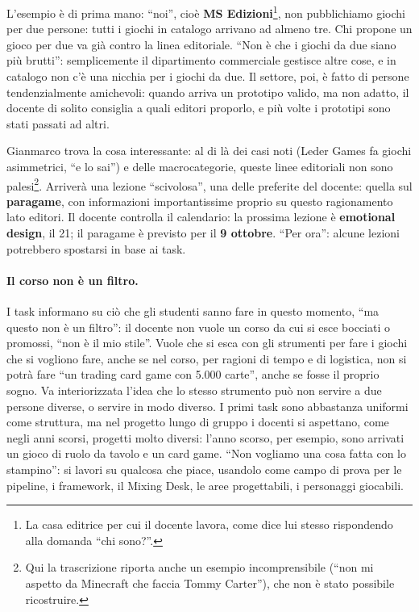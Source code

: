 L'esempio è di prima mano: ``noi'', cioè \textbf{MS Edizioni}\footnote{La casa editrice
per cui il docente lavora, come dice lui stesso rispondendo alla domanda ``chi
sono?''.}, non pubblichiamo giochi per due persone: tutti i giochi in catalogo
arrivano ad almeno tre. Chi propone un gioco per due va già contro la linea
editoriale. ``Non è che i giochi da due siano più brutti'': semplicemente il
dipartimento commerciale gestisce altre cose, e in catalogo non c'è una nicchia per
i giochi da due. Il settore, poi, è fatto di persone tendenzialmente amichevoli:
quando arriva un prototipo valido, ma non adatto, il docente di solito consiglia a
quali editori proporlo, e più volte i prototipi sono stati passati ad altri.

Gianmarco trova la cosa interessante: al di là dei casi noti (Leder Games fa giochi
asimmetrici, ``e lo sai'') e delle macrocategorie, queste linee editoriali non sono
palesi\footnote{Qui la trascrizione riporta anche un esempio incomprensibile (``non
mi aspetto da Minecraft che faccia Tommy Carter''), che non è stato possibile
ricostruire.}. Arriverà una lezione ``scivolosa'', una delle preferite del docente:
quella sul \textbf{paragame}, con informazioni importantissime proprio su questo
ragionamento lato editori. Il docente controlla il calendario: la prossima lezione è
\textbf{emotional design}, il 21; il paragame è previsto per il \textbf{9 ottobre}.
``Per ora'': alcune lezioni potrebbero spostarsi in base ai task.

\paragraph{Il corso non è un filtro.} I task informano su ciò che gli studenti sanno
fare in questo momento, ``ma questo non è un filtro'': il docente non vuole un corso
da cui si esce bocciati o promossi, ``non è il mio stile''. Vuole che si esca con gli
strumenti per fare i giochi che si vogliono fare, anche se nel corso, per ragioni
di tempo e di logistica, non si potrà fare ``un trading card game con 5.000 carte'',
anche se fosse il proprio sogno. Va interiorizzata l'idea che lo stesso strumento
può non servire a due persone diverse, o servire in modo diverso. I primi task sono
abbastanza uniformi come struttura, ma nel progetto lungo di gruppo i docenti si
aspettano, come negli anni scorsi, progetti molto diversi: l'anno scorso, per
esempio, sono arrivati un gioco di ruolo da tavolo e un card game. ``Non vogliamo
una cosa fatta con lo stampino'': si lavori su qualcosa che piace, usandolo come campo
di prova per le pipeline, i framework, il Mixing Desk, le aree progettabili, i
personaggi giocabili.

